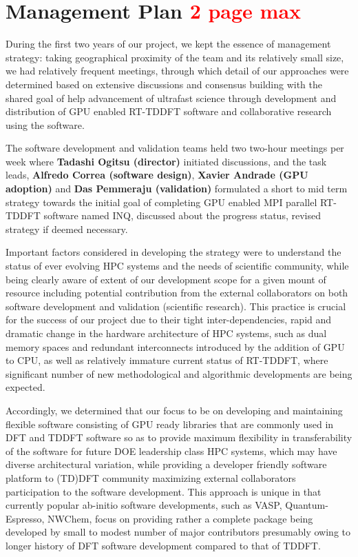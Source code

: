 \section{Management Plan \textcolor{red}{2 page max}}
\label{sec:manage}

During the first two years of our project, we kept the essence of management strategy: taking geographical proximity of the team and its relatively small size, we had relatively frequent meetings, through which detail of our approaches were determined based on extensive discussions and consensus building with the shared goal of help advancement of ultrafast science through development and distribution of GPU enabled RT-TDDFT software and collaborative research using the software. 

The software development and validation teams held two two-hour meetings per week where {\bf Tadashi Ogitsu (director)} initiated discussions, and the task leads, {\bf Alfredo Correa (software design)}, {\bf Xavier Andrade (GPU adoption)} and {\bf Das Pemmeraju (validation)} formulated a short to mid term strategy towards the initial goal of completing GPU enabled MPI parallel RT-TDDFT software named INQ, discussed about the progress status, revised strategy if deemed necessary.

Important factors considered  in developing the strategy were to understand the status of ever evolving HPC systems and the needs of scientific community, while being clearly aware of extent of our development scope for a given mount of resource including potential contribution from the external collaborators on both software development and validation (scientific research). This practice is crucial for the success of our project due to their tight inter-dependencies, rapid and dramatic change in the hardware architecture of HPC systems, such as dual memory spaces and redundant interconnects introduced by the addition of GPU to CPU, as well as relatively immature current status of RT-TDDFT, where significant number of new methodological and algorithmic developments are being expected. 

Accordingly, we determined that our focus to be on developing and maintaining flexible software consisting of GPU ready libraries that are commonly used in DFT and TDDFT software so as to provide maximum flexibility in transferability of the software for future DOE leadership class HPC systems, which may have diverse architectural variation, while providing a developer friendly software platform to (TD)DFT community maximizing external collaborators participation to the software development. This approach is unique in that currently popular ab-initio software developments, such as VASP, Quantum-Espresso, NWChem, focus on providing rather a complete package being developed by small to modest number of major contributors presumably owing to longer history of DFT software development compared to that of TDDFT.

